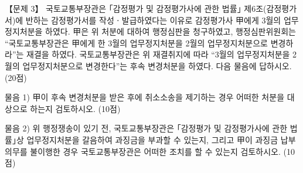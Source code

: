 \begin{longquestion}{【문제 3】}
국토교통부장관은 ｢감정평가 및 감정평가사에 관한 법률｣ 제6조(감정평가서)에 반하는 감정평가서를 작성ㆍ발급하였다는 이유로 감정평가사 甲에게 3월의 업무정지처분을 하였다. 甲은 위 처분에 대하여 행정심판을 청구하였고, 행정심판위원회는 “국토교통부장관은 甲에게 한 3월의 업무정지처분을 2월의 업무정지처분으로 변경하라”는 재결을 하였다. 국토교통부장관은 위 재결취지에 따라 “3월의 업무정지처분을 2월의 업무정지처분으로 변경한다”는 후속 변경처분을 하였다. 다음 물음에 답하시오. (20점) \par
\medskip\noindent 물음 1) 甲이 후속 변경처분을 받은 후에 취소소송을 제기하는 경우 어떠한 처분을 대상으로 하는지 검토하시오. (10점) \par
\medskip\noindent 물음 2) 위 행정쟁송이 있기 전, 국토교통부장관은 ｢감정평가 및 감정평가사에 관한 법률｣상 업무정지처분을 갈음하여 과징금을 부과할 수 있는지, 그리고 甲이 과징금 납부의무를 불이행한 경우 국토교통부장관은 어떠한 조치를 할 수 있는지 검토하시오. (10점) \par
\end{longquestion}
